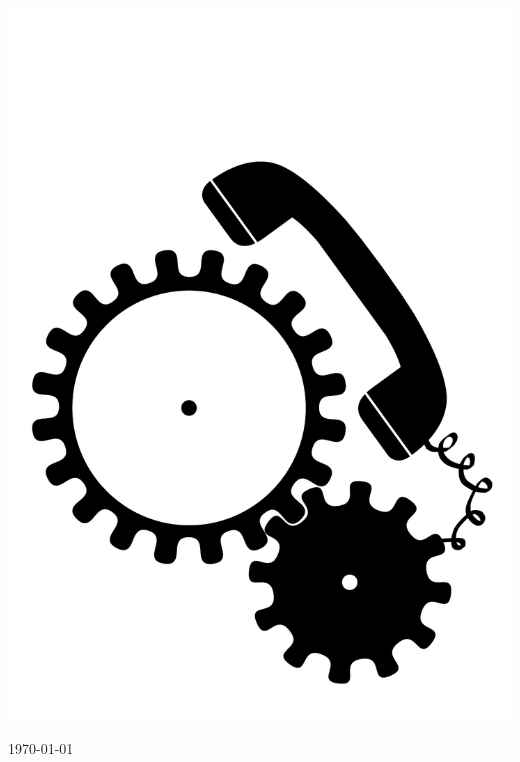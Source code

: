 \begin{titlepage}
\begin{picture}
\includegraphics[scale=0.35]{dyncall_logo}%
\end{picture}%
\endgroup%
%
%
%
\begin{center}
	\today
\end{center}
\end{titlepage}

